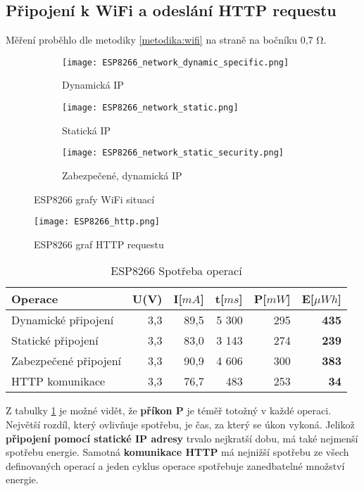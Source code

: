 \documentclass[a4paper, 12pt]{report}
\begin{document}
			\subsection{Připojení k WiFi a odeslání HTTP requestu}
				Měření proběhlo dle metodiky \ref{metodika:wifi} na straně \pageref{metodika:wifi} na bočníku 0,7 \si{\ohm}.

				\begin{figure}[h!]
					\centering
					\begin{subfigure}[b]{0.4\linewidth}
						\texttt{[image: ESP8266\_network\_dynamic\_specific.png]}
						\caption{Dynamická IP}
					\end{subfigure}
					\begin{subfigure}[b]{0.4\linewidth}
						\texttt{[image: ESP8266\_network\_static.png]}
						\caption{Statická IP}
					\end{subfigure}
					\begin{subfigure}[b]{0.4\linewidth}
						\texttt{[image: ESP8266\_network\_static\_security.png]}
						\caption{Zabezpečené, dynamická IP}
					\end{subfigure}
					\caption{ESP8266 grafy WiFi situací}
					\label{ESP8266_network}
				\end{figure}

				\begin{figure}[h!]
					\centering
					\texttt{[image: ESP8266\_http.png]}
					\caption{ESP8266 graf HTTP requestu}
					\label{ESP8266_http}
				\end{figure}


				\begin{table}[h]
					\centering
					\caption{ESP8266 Spotřeba operací}
					\begin{tabular}{||l| r r r r |r||}
						\hline
						Operace & U(V) & I[$mA$] & t[$ms$] & P[$mW$] & \textbf{E}[$\mu Wh$]\\
						\hline
						\hline
					Dynamické připojení & 3,3 & 89,5 & 5 300 & 295 & \textbf{435}\\
					Statické připojení & 3,3 & 83,0 & 3 143 & 274 & \textbf{239}\\
					Zabezpečené připojení & 3,3 & 90,9 & 4 606 & 300 & \textbf{383}\\
					HTTP komunikace & 3,3 & 76,7 & 483 & 253 & \textbf{34}\\
					\hline
					\end{tabular}
					\label{Spotreba_operaci}
				\end{table}
					Z tabulky \ref{Spotreba_operaci} je možné vidět, že {\bf příkon P} je téměř totožný v každé operaci. Největší rozdíl, který ovlivňuje spotřebu, je čas, za který se úkon vykoná. Jelikož {\bf připojení pomocí statické IP adresy} trvalo nejkratší dobu, má také nejmenší spotřebu energie.
					Samotná {\bf komunikace HTTP} má nejnižší spotřebu ze všech definovaných operací a jeden cyklus operace spotřebuje zanedbatelné množství energie.
\end{document}
